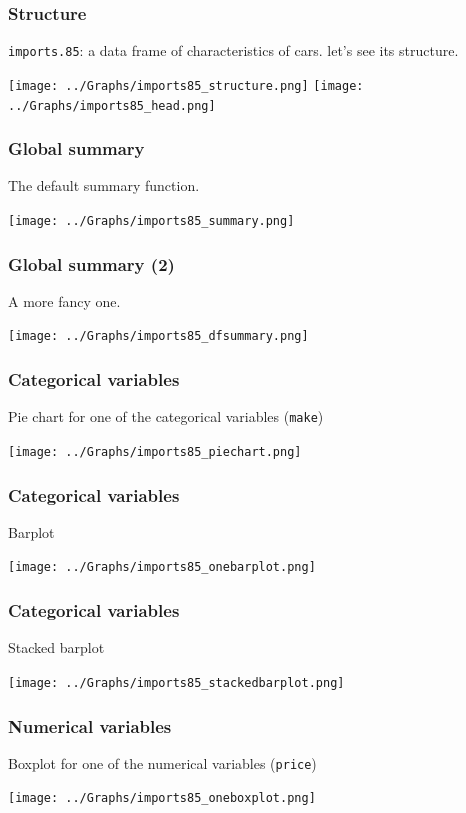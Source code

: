 \begin{frame}
\frametitle{Structure}
{\tt imports.85}: a data frame of characteristics of cars. let's see its structure. 
\begin{center}
\texttt{[image: ../Graphs/imports85\_structure.png]}
\texttt{[image: ../Graphs/imports85\_head.png]}
\end{center}
\end{frame}
\begin{frame}
\frametitle{Global summary}
The default summary function.
\begin{center}
\texttt{[image: ../Graphs/imports85\_summary.png]}
\end{center}
\end{frame}
\begin{frame}
\frametitle{Global summary (2)}
A more fancy one.
\begin{center}
\texttt{[image: ../Graphs/imports85\_dfsummary.png]}
\end{center}
\end{frame}
\begin{frame}
\frametitle{Categorical variables}
Pie chart for one of the categorical variables ({\tt make})
\begin{center}
\texttt{[image: ../Graphs/imports85\_piechart.png]}
\end{center}
\end{frame}
\begin{frame}
\frametitle{Categorical variables}
Barplot
\begin{center}
\texttt{[image: ../Graphs/imports85\_onebarplot.png]}
\end{center}
\end{frame}
\begin{frame}
\frametitle{Categorical variables}
Stacked barplot
\begin{center}
\texttt{[image: ../Graphs/imports85\_stackedbarplot.png]}
\end{center}
\end{frame}
\begin{frame}
\frametitle{Numerical variables}
Boxplot for one of the numerical variables ({\tt price})
\begin{center}
\texttt{[image: ../Graphs/imports85\_oneboxplot.png]}
\end{center}
\end{frame}
